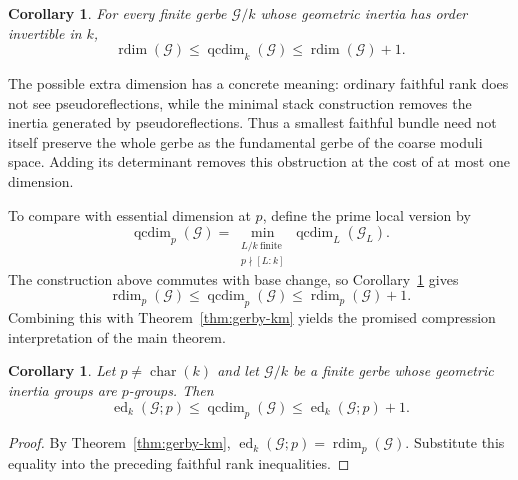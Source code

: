 \documentclass[11pt,reqno]{amsart}
\numberwithin{equation}{section}
\theoremstyle{plain}
\newtheorem{coro}[prop]{Corollary}
\theoremstyle{definition}
\def\cG{{\mathcal G}}
\def\rdim{{\operatorname{rdim}}}
\def\ed{{\operatorname{ed}}}
\begin{document}
\begin{coro}\label{cor:qcdim-rdim}
For every finite gerbe $\cG/k$ whose geometric inertia has order invertible in
$k$,
\[
\rdim(\cG)
\le
\operatorname{qcdim}_k(\cG)
\le
\rdim(\cG)+1.
\]
\end{coro}

The possible extra dimension has a concrete meaning: ordinary faithful rank
does not see pseudoreflections, while the minimal stack construction removes
the inertia generated by pseudoreflections. Thus a smallest faithful bundle
need not itself preserve the whole gerbe as the fundamental gerbe of the
coarse moduli space. Adding its determinant removes this obstruction at the cost
of at most one dimension.

To compare with essential dimension at $p$, define the prime local version by
\[
\operatorname{qcdim}_p(\cG)
=
\min_{\substack{L/k\ \mathrm{finite}\\ p\nmid[L:k]}}
\operatorname{qcdim}_L(\cG_L).
\]
The construction above commutes with base change, so Corollary~\ref{cor:qcdim-rdim}
gives
\[
\rdim_p(\cG)
\le
\operatorname{qcdim}_p(\cG)
\le
\rdim_p(\cG)+1.
\]
Combining this with Theorem~\ref{thm:gerby-km} yields the promised
compression interpretation of the main theorem.

\begin{coro}\label{thm:qcdim-ed}
Let $p\ne\operatorname{char}(k)$ and let $\cG/k$ be a finite gerbe whose
geometric inertia groups are $p$-groups.  Then
\[
\ed_k(\cG;p)
\le
\operatorname{qcdim}_p(\cG)
\le
\ed_k(\cG;p)+1.
\]
\end{coro}

\begin{proof}
By Theorem~\ref{thm:gerby-km},
$\ed_k(\cG;p)=\rdim_p(\cG)$.  Substitute this equality into the preceding
faithful rank inequalities.
\end{proof}



\end{document}
